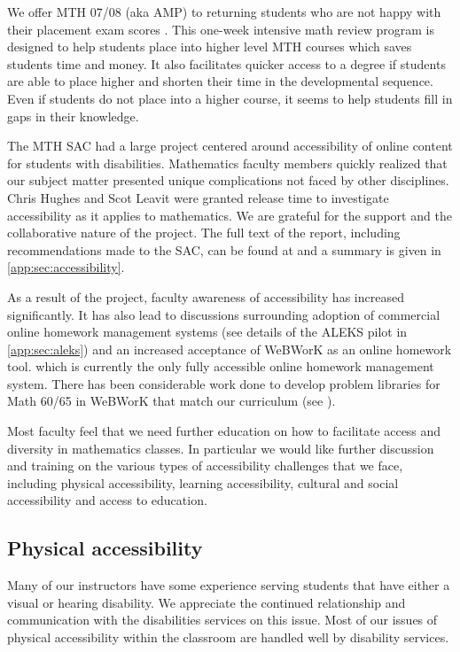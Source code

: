 We offer MTH 07/08 (aka AMP) to returning students who are not happy with their placement exam scores . This one-week intensive math review program is designed to help students place into higher level MTH courses which saves students time and money. It also facilitates quicker access to a degree if students are able to place higher and shorten their time in the developmental sequence.  Even if students do not place into a higher course, it seems to help students fill in gaps in their knowledge.

The MTH SAC had a large project centered around accessibility of online content for students with disabilities. Mathematics faculty members quickly realized that our subject matter presented unique complications not faced by other disciplines. Chris Hughes and Scot Leavit were granted release time to investigate accessibility as it applies to mathematics. We are grateful for the support and the collaborative nature of the project. The full text of the report, including recommendations made to the SAC, can be found at \cite{accessibilityproject} and a summary is given in \vref{app:sec:accessibility}.

As a result of the project, faculty awareness of accessibility has increased significantly. It has also lead to discussions surrounding adoption of commercial online homework management systems (see details of the ALEKS pilot in \vref{app:sec:aleks}) and an increased acceptance of WeBWorK as an online homework tool. which is currently the only fully accessible online homework management system. There has been considerable work done to develop problem libraries for Math 60/65 in WeBWorK that match our curriculum (see ).

Most faculty feel that we need further education on how to facilitate access and diversity in mathematics classes. In particular we would like further discussion and training on the various types of accessibility challenges that we face, including physical accessibility, learning accessibility, cultural and social accessibility and access to education.

\subsection{Physical accessibility}
Many of our instructors have some experience serving students that have either a visual or hearing disability. We appreciate the continued relationship and communication with the disabilities services on this issue. Most of our issues of physical accessibility within the classroom are handled well by disability services. 


